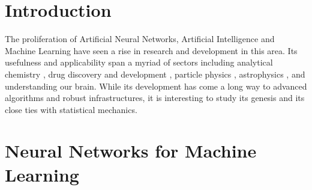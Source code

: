 \documentclass[%
 reprint,
 amsmath,amssymb,
 aps,
]{revtex4-2}
\begin{document}
\maketitle


\section{\label{sec:level1}Introduction}

The proliferation of Artificial Neural Networks, Artificial Intelligence and Machine Learning have seen a rise in research and development in this area. Its usefulness and applicability span a myriad of sectors including analytical chemistry \cite{DEBUS2021116459}, drug discovery and development \cite{jimenez2020drug}, particle physics \cite{Shlomi_2021}, astrophysics \cite{george2018deep}, and understanding our brain. While its development has come a long way to advanced algorithms and robust infrastructures, it is interesting to study its genesis and its close ties with statistical mechanics.


\section{\label{sec:NN for ML}Neural Networks for Machine Learning}
\end{document}

